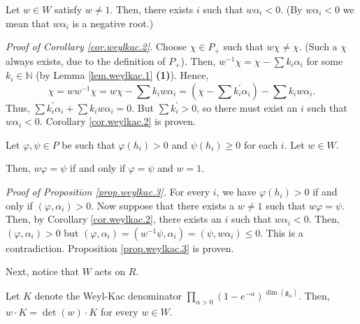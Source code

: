 \documentclass[etingof-lie.tex]{subfiles}
\begin{document}
\begin{corollary}
\label{cor.weylkac.2}Let $w\in W$ satisfy $w\neq1$. Then, there exists $i$
such that $w\alpha_{i}<0$. (By $w\alpha_{i}<0$ we mean that $w\alpha_{i}$ is a
negative root.)
\end{corollary}

\textit{Proof of Corollary \ref{cor.weylkac.2}.} Choose $\chi\in P_{+}$ such
that $w\chi\neq\chi$. (Such a $\chi$ always exists, due to the definition of
$P_{+}$). Then, $w^{-1}\chi=\chi-\sum k_{i}\alpha_{i}$ for some $k_{i}%
\in\mathbb{N}$ (by Lemma \ref{lem.weylkac.1} \textbf{(1)}). Hence,%
\[
\chi=ww^{-1}\chi=w\chi-\sum k_{i}w\alpha_{i}=\left(  \chi-\sum k_{i}^{\prime
}\alpha_{i}\right)  -\sum k_{i}w\alpha_{i}.
\]
Thus, $\sum k_{i}^{\prime}\alpha_{i}+\sum k_{i}w\alpha_{i}=0$. But $\sum
k_{i}^{\prime}>0$, so there must exist an $i$ such that $w\alpha_{i}<0$.
Corollary \ref{cor.weylkac.2} is proven.

\begin{proposition}
\label{prop.weylkac.3}Let $\varphi,\psi\in P$ be such that $\varphi\left(
h_{i}\right)  >0$ and $\psi\left(  h_{i}\right)  \geq0$ for each $i$. Let
$w\in W$.

Then, $w\varphi=\psi$ if and only if $\varphi=\psi$ and $w=1$.
\end{proposition}

\textit{Proof of Proposition \ref{prop.weylkac.3}.} For every $i$, we have
$\varphi\left(  h_{i}\right)  >0$ if and only if $\left(  \varphi,\alpha
_{i}\right)  >0$. Now suppose that there exists a $w\neq1$ such that
$w\varphi=\psi$. Then, by Corollary \ref{cor.weylkac.2}, there exists an $i$
such that $w\alpha_{i}<0$. Then, $\left(  \varphi,\alpha_{i}\right)  >0$ but
$\left(  \varphi,\alpha_{i}\right)  =\left(  w^{-1}\psi,\alpha_{i}\right)
=\left(  \psi,w\alpha_{i}\right)  \leq0$. This is a contradiction. Proposition
\ref{prop.weylkac.3} is proven.

Next, notice that $W$ acts on $R$.

\begin{proposition}
\label{prop.weylkac.4}Let $K$ denote the Weyl-Kac denominator $\prod
\limits_{\alpha>0}\left(  1-e^{-\alpha}\right)  ^{\dim\left(  \mathfrak{g}%
_{\alpha}\right)  }$. Then, $w\cdot K=\det\left(  w\right)  \cdot K$ for every
$w\in W$.
\end{proposition}
\end{document}
